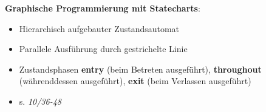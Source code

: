 \bigskip
\textbf{Graphische Programmierung mit Statecharts}:
\begin{itemize}
	\item Hierarchisch aufgebauter Zustandsautomat
	\item Parallele Ausführung durch gestrichelte Linie
	\item Zustandsphasen \textbf{entry} (beim Betreten ausgeführt), \textbf{throughout} (währenddessen ausgeführt), \textbf{exit} (beim Verlassen ausgeführt)
	\item s. \textit{10/36-48}
\end{itemize}